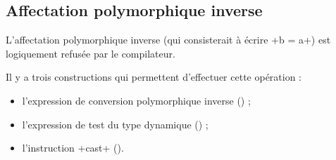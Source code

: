 \subsection{Affectation polymorphique inverse}

L'affectation polymorphique inverse (qui consisterait à écrire \ggs+b = a+) est logiquement refusée par le compilateur.

Il y a trois constructions qui permettent d'effectuer cette opération :
\begin{itemize}
  \item l'expression de conversion polymorphique inverse () ;
  \item l'expression de test du type dynamique () ;
  \item l'instruction \ggs+cast+ ().
\end{itemize}

%
%
%
%
%
%
%
%



